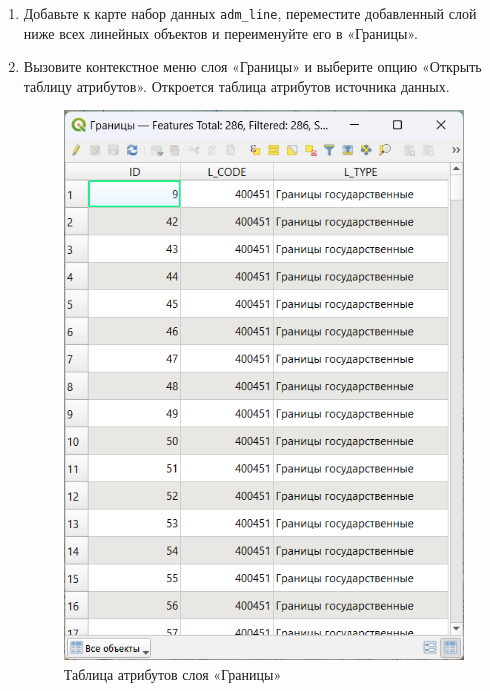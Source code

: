 \documentclass[
  12pt,
]{book}
\begin{document}
\begin{enumerate}
\def\labelenumi{\arabic{enumi}.}
\item
  Добавьте к карте набор данных \texttt{adm\_line}, переместите добавленный слой ниже всех линейных объектов и переименуйте его в «Границы».
\item
  Вызовите контекстное меню слоя «Границы» и выберите опцию «Открыть таблицу атрибутов». Откроется таблица атрибутов источника данных.

  \begin{figure}
  \centering
  \includegraphics{images/Ex01_MapGeneral/AttributeTable.png}
  \caption{Таблица атрибутов слоя «Границы»}
  \end{figure}


\end{enumerate}
\end{document}

